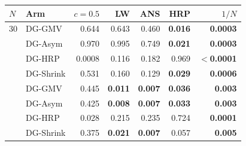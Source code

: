 \begin{tabular}{@{}llrrrrr@{}}
\toprule
$N$ & Arm & $c{=}0.5$ & LW & ANS & HRP & $1/N$\\
\midrule
30 & DG-GMV & 0.644 & 0.643 & 0.460 & \textbf{0.016} & \textbf{0.0003}\\
 & DG-Asym & 0.970 & 0.995 & 0.749 & \textbf{0.021} & \textbf{0.0003}\\
 & DG-HRP & 0.0008 & 0.116 & 0.182 & 0.969 & \textbf{$<$0.0001}\\
 & DG-Shrink & 0.531 & 0.160 & 0.129 & \textbf{0.029} & \textbf{0.0006}\\
\addlinespace[2pt]
70 & DG-GMV & 0.445 & \textbf{0.011} & \textbf{0.007} & \textbf{0.036} & \textbf{0.003}\\
 & DG-Asym & 0.425 & \textbf{0.008} & \textbf{0.007} & \textbf{0.033} & \textbf{0.003}\\
 & DG-HRP & 0.028 & 0.215 & 0.235 & 0.724 & \textbf{0.0001}\\
 & DG-Shrink & 0.375 & \textbf{0.021} & \textbf{0.007} & 0.057 & \textbf{0.005}\\
\bottomrule
\end{tabular}
